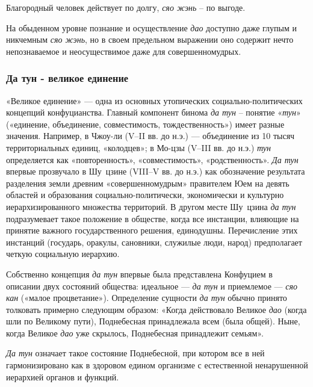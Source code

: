 \documentclass[twoside,a4paper]{article}
\begin{document}
{
Благородный человек действует по долгу, \textit{сяо жэнь} – по выгоде.}

{
На обыденном уровне познание и осуществление \textit{дао} доступно даже глупым и никчемным \textit{сяо жэнь}, но в своем
предельном выражении оно содержит нечто непознаваемое и неосуществимое даже для
{\textquotedbl}совершенномудрых{\textquotedbl}. }

\subsubsection{Да тун - великое единение }
{
«Великое единение» — одна из основных утопических социально-политических концепций конфуцианства. Главный компонент
бинома \textit{да тун} – понятие «\textit{тун}» («единение, объединение, совместимость, тождественность») имеет разные
значения. Например, в Чжоу-ли (\foreignlanguage{english}{V}–\foreignlanguage{english}{II} вв. до н.э.) — объединение из
10 тысяч территориальных единиц, «колодцев»; в Мо-цзы (\foreignlanguage{english}{V}–\foreignlanguage{english}{III} вв.
до н.э.) \textit{тун} определяется как «повторенность», «совместимость», «родственность». \textit{Да тун} впервые
прозвучало в Шу~цзине (\foreignlanguage{english}{VIII}–\foreignlanguage{english}{V} вв. до н.э.) как обозначение
результата разделения земли древним «совершенномудрым» правителем Юем на девять областей и образования
социально-политически, экономически и культурно иерархизированного множества территорий. В другом месте Шу~цзина
\textit{да тун} подразумевает такое положение в обществе, когда все инстанции, влияющие на принятие важного
государственного решения, единодушны. Перечисление этих инстанций (государь, оракулы, сановники, служилые люди, народ)
предполагает четкую социальную иерархию. }

{
Собственно концепция \textit{да тун} впервые была представлена Конфуцием в описании двух состояний общества: идеальное —
\textit{да тун} и приемлемое — \textit{сяо кан} («малое процветание»). Определение сущности \textit{да тун} обычно
принято толковать примерно следующим образом: «Когда действовало Великое \textit{дао} (когда шли по Великому пути),
Поднебесная принадлежала всем (была общей). Ныне, когда Великое \textit{дао} уже скрылось, Поднебесная принадлежит
семьям». }

{
\textit{Да тун} означает такое состояние Поднебесной, при котором все в ней гармонизировано как в здоровом едином
организме с естественной ненарушенной иерархией органов и функций. }
\end{document}
